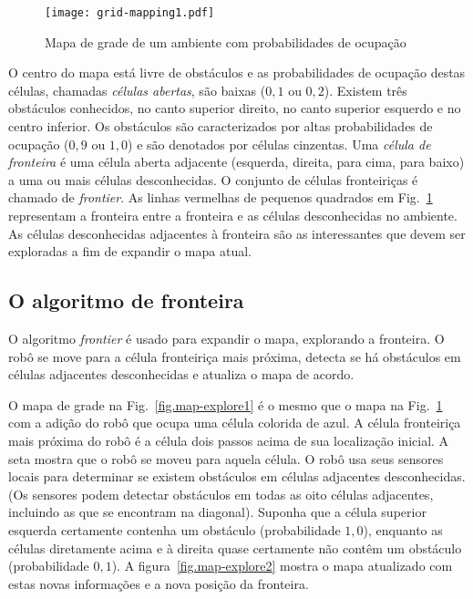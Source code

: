 \begin{figure}
\begin{center}
\texttt{[image: grid-mapping1.pdf]}
\end{center}
\caption{Mapa de grade de um ambiente com probabilidades de ocupação}\label{fig.map-explore}
\end{figure}

O centro do mapa está livre de obstáculos e as probabilidades de ocupação destas células, chamadas \emph{células abertas}, são baixas ($0,1$ ou $0,2$). Existem três obstáculos conhecidos, no canto superior direito, no canto superior esquerdo e no centro inferior. Os obstáculos são caracterizados por altas probabilidades de ocupação ($0,9$ ou $1,0$) e são denotados por células cinzentas. Uma \emph{célula de fronteira} é uma célula aberta adjacente (esquerda, direita, para cima, para baixo) a uma ou mais células desconhecidas. O conjunto de células fronteiriças é chamado de \emph{frontier}. As linhas vermelhas de pequenos quadrados em Fig.~\ref{fig.map-explore} representam a fronteira entre a fronteira e as células desconhecidas no ambiente. As células desconhecidas adjacentes à fronteira são as interessantes que devem ser exploradas a fim de expandir o mapa atual.

\subsection{O algoritmo de fronteira}

O algoritmo \emph{frontier} é usado para expandir o mapa, explorando a fronteira. O robô se move para a célula fronteiriça mais próxima, detecta se há obstáculos em células adjacentes desconhecidas e atualiza o mapa de acordo. 

O mapa de grade na Fig.~\ref{fig.map-explore1} é o mesmo que o mapa na Fig.~\ref{fig.map-explore} com a adição do robô que ocupa uma célula colorida de azul. A célula fronteiriça mais próxima do robô é a célula dois passos acima de sua localização inicial. A seta mostra que o robô se moveu para aquela célula. O robô usa seus sensores locais para determinar se existem obstáculos em células adjacentes desconhecidas. (Os sensores podem detectar obstáculos em todas as oito células adjacentes, incluindo as que se encontram na diagonal). Suponha que a célula superior esquerda certamente contenha um obstáculo (probabilidade $1,0$), enquanto as células diretamente acima e à direita quase certamente não contêm um obstáculo (probabilidade $0,1$). A figura~\ref{fig.map-explore2} mostra o mapa atualizado com estas novas informações e a nova posição da fronteira.


